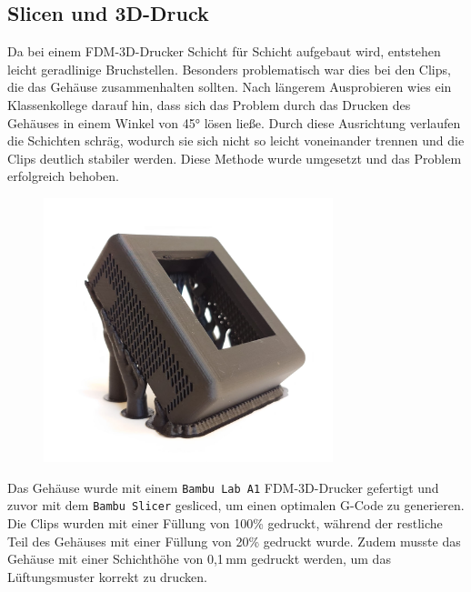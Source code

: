 \begin{inhalt}
\section{Slicen und 3D-Druck}

Da bei einem FDM-3D-Drucker Schicht für Schicht aufgebaut wird, entstehen leicht geradlinige Bruchstellen.  
Besonders problematisch war dies bei den Clips, die das Gehäuse zusammenhalten sollten.  
Nach längerem Ausprobieren wies ein Klassenkollege darauf hin, dass sich das Problem durch das Drucken des Gehäuses in einem Winkel von 45° lösen ließe.  
Durch diese Ausrichtung verlaufen die Schichten schräg, wodurch sie sich nicht so leicht voneinander trennen und die Clips deutlich stabiler werden.  
Diese Methode wurde umgesetzt und das Problem erfolgreich behoben.


\begin{figure}[!htb]
\centering
\includegraphics[width=0.75\textwidth]{files/Thomas/pics/geheause/gehaeuese_45_Grad_druck.png}
\caption[Bildbezeichnung für Abbildungsverzeichnis]{}
\label{fig:gehaeuse_internet_bild}
\end{figure}

Das Gehäuse wurde mit einem \texttt{Bambu Lab A1} FDM-3D-Drucker gefertigt und zuvor mit dem \texttt{Bambu Slicer} gesliced, um einen optimalen G-Code zu generieren.  
Die Clips wurden mit einer Füllung von 100\% gedruckt, während der restliche Teil des Gehäuses mit einer Füllung von 20\% gedruckt wurde.  
Zudem musste das Gehäuse mit einer Schichthöhe von 0{,}1\,mm gedruckt werden, um das Lüftungsmuster korrekt zu drucken.


\end{inhalt}